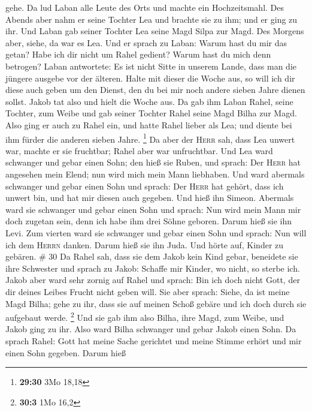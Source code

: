 gehe.  Da lud Laban alle Leute des Orts und machte ein
Hochzeitsmahl.  Des Abends aber nahm er seine Tochter Lea
und brachte sie zu ihm; und er ging zu ihr.  Und Laban
gab seiner Tochter Lea seine Magd Silpa zur Magd.  Des
Morgens aber, siehe, da war es Lea. Und er sprach zu Laban: Warum hast
du mir das getan? Habe ich dir nicht um Rahel gedient? Warum hast du
mich denn betrogen?  Laban antwortete: Es ist nicht Sitte
in unserem Lande, dass man die jüngere ausgebe vor der älteren.
 Halte mit dieser die Woche aus, so will ich dir diese
auch geben um den Dienst, den du bei mir noch andere sieben Jahre dienen
sollst.  Jakob tat also und hielt die Woche aus. Da gab
ihm Laban Rahel, seine Tochter, zum Weibe  und gab seiner
Tochter Rahel seine Magd Bilha zur Magd.  Also ging er
auch zu Rahel ein, und hatte Rahel lieber als Lea; und diente bei ihm
fürder die anderen sieben Jahre. \footnote{\textbf{29:30} 3Mo 18,18}
 Da aber der \textsc{Herr} sah, dass Lea unwert war,
machte er sie fruchtbar; Rahel aber war unfruchtbar.  Und
Lea ward schwanger und gebar einen Sohn; den hieß sie Ruben, und sprach:
Der \textsc{Herr} hat angesehen mein Elend; nun wird mich mein Mann
liebhaben.  Und ward abermals schwanger und gebar einen
Sohn und sprach: Der \textsc{Herr} hat gehört, dass ich unwert bin, und
hat mir diesen auch gegeben. Und hieß ihn Simeon. 
Abermals ward sie schwanger und gebar einen Sohn und sprach: Nun wird
mein Mann mir doch zugetan sein, denn ich habe ihm drei Söhne geboren.
Darum hieß sie ihn Levi.  Zum vierten ward sie schwanger
und gebar einen Sohn und sprach: Nun will ich dem \textsc{Herrn} danken.
Darum hieß sie ihn Juda. Und hörte auf, Kinder zu gebären. \# 30
 Da Rahel sah, dass sie dem Jakob kein Kind gebar,
beneidete sie ihre Schwester und sprach zu Jakob: Schaffe mir Kinder, wo
nicht, so sterbe ich.  Jakob aber ward sehr zornig auf
Rahel und sprach: Bin ich doch nicht Gott, der dir deines Leibes Frucht
nicht geben will.  Sie aber sprach: Siehe, da ist meine
Magd Bilha; gehe zu ihr, dass sie auf meinen Schoß gebäre und ich doch
durch sie aufgebaut werde. \footnote{\textbf{30:3} 1Mo 16,2}
 Und sie gab ihm also Bilha, ihre Magd, zum Weibe, und
Jakob ging zu ihr.  Also ward Bilha schwanger und gebar
Jakob einen Sohn.  Da sprach Rahel: Gott hat meine Sache
gerichtet und meine Stimme erhört und mir einen Sohn gegeben. Darum hieß
